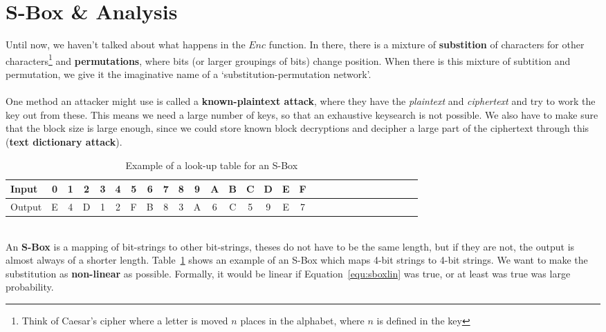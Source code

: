 \section{S-Box \& Analysis}\label{sec:sbox}
    Until now, we haven't talked about what happens in the $Enc$ function. In there, there is a mixture of \textbf{substition} of characters for other characters\footnote{Think of Caesar's cipher where a letter is moved $n$ places in the alphabet, where $n$ is defined in the key} and \textbf{permutations}, where bits (or larger groupings of bits) change position. When there is this mixture of subtition and permutation, we give it the imaginative name of a `substitution-permutation network'.\\
    \\
    One method an attacker might use is called a \textbf{known-plaintext attack}, where they have the \textit{plaintext} and \textit{ciphertext} and try to work the key out from these. This means we need a large number of keys, so that an exhaustive keysearch is not possible. We also have to make sure that the block size is large enough, since we could store known block decryptions and decipher a large part of the ciphertext through this (\textbf{text dictionary attack}).\\
    \begin{table}[htp!]
        \centering
        \begin{tabular}{lccccccccccccccccccccccccccc}
            \toprule
            Input & 0 & 1 & 2 & 3 & 4 & 5 & 6 & 7 & 8 & 9 & A & B & C & D  & E & F\\
            \midrule
            Output & E & 4 & D & 1 & 2 & F & B & 8 & 3 & A & 6 & C & 5 & 9 & E & 7\\
            \bottomrule
        \end{tabular}
        \caption{Example of a look-up table for an S-Box}
        \label{fig:lookupsbox}
    \end{table}
    \\
    An \textbf{S-Box} is a mapping of bit-strings to other bit-strings, theses do not have to be the same length, but if they are not, the output is almost always of a shorter length. Table~\ref{fig:lookupsbox} shows an example of an S-Box which maps 4-bit strings to 4-bit strings. We want to make the substitution as \textbf{non-linear} as possible. Formally, it would be linear if Equation~\ref{equ:sboxlin} was true, or at least was true was large probability.
    
